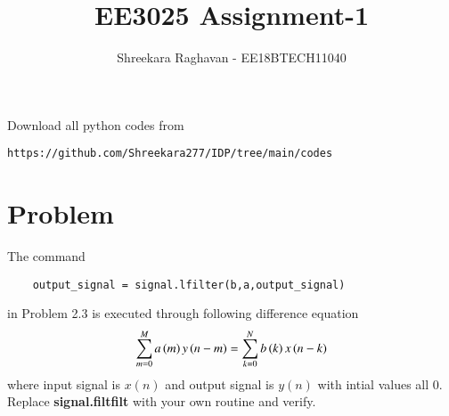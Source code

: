 \documentclass[journal,12pt,twocolumn]{IEEEtran}
\begin{document}
     \def\rightbox#1{\makebox[0in][r]{#1}}
     \def\centbox#1{\makebox[0in]{#1}}
     \def\topbox#1{\raisebox{-\baselineskip}[0in][0in]{#1}}
     \def\midbox#1{\raisebox{-0.5\baselineskip}[0in][0in]{#1}}
\vspace{3cm}
\title{EE3025 Assignment-1}
\author{Shreekara Raghavan  - EE18BTECH11040}
\maketitle
\newpage
\bigskip
\renewcommand{\thefigure}{\theenumi}
\renewcommand{\thetable}{\theenumi}
Download all python codes from 
\begin{lstlisting}
https://github.com/Shreekara277/IDP/tree/main/codes
\end{lstlisting}

\section{Problem}
    
The command
\begin{lstlisting}
    output_signal = signal.lfilter(b,a,output_signal)
\end{lstlisting}
in Problem 2.3 is executed through following difference equation 
    \begin{align}
    \label{eq:equation1}
        \sum _{m=0}^{M}a\left(m\right)y\left(n-m\right)=\sum _{k=0}^{N}b\left(k\right)x\left(n-k\right)
    \end{align}
 where input signal is $x(n)$ and output signal is $y(n)$ with intial values all 0. Replace \textbf{signal.filtfilt} with your own routine and verify.
\end{document}
